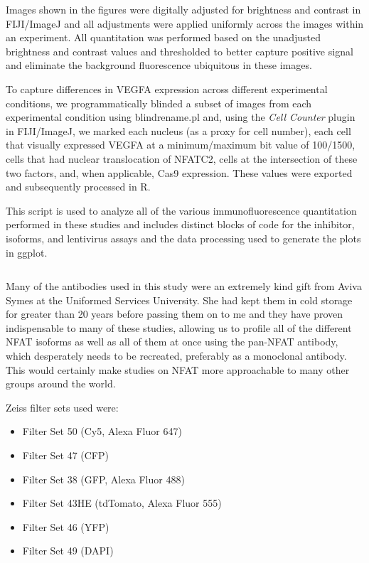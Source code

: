 Images shown in the figures were digitally adjusted for brightness and contrast in FIJI/ImageJ \citep{Schindelin2012} and all adjustments were applied uniformly across the images within an experiment. All quantitation was performed based on the unadjusted brightness and contrast values and thresholded to better capture positive signal and eliminate the background fluorescence ubiquitous in these images.

To capture differences in VEGFA expression across different experimental conditions, we programmatically blinded a subset of images from each experimental condition using blindrename.pl \citep{Salter2016} and, using the \textit{Cell Counter} plugin in FIJI/ImageJ, we marked each nucleus (as a proxy for cell number), each cell that visually expressed VEGFA at a minimum/maximum bit value of 100/1500, cells that had nuclear translocation of NFATC2, cells at the intersection of these two factors, and, when applicable, Cas9 expression. These values were exported and subsequently processed in R.

\begin{code}
\caption{This script is used to analyze all of the various immunofluorescence quantitation performed in these studies and includes distinct blocks of code for the inhibitor, isoforms, and lentivirus assays and the data processing used to generate the plots in ggplot.}
\label{thp1analysis}

\inputminted[breaklines,frame=single,fontsize=\small]{r}{source/THP-1_Processing.R}

\end{code}

Many of the antibodies used in this study were an extremely kind gift from Aviva Symes at the Uniformed Services University. She had kept them in cold storage for greater than 20 years before passing them on to me and they have proven indispensable to many of these studies, allowing us to profile all of the different NFAT isoforms as well as all of them at once using the pan\hyp{}NFAT antibody, which desperately needs to be recreated, preferably as a monoclonal antibody. This would certainly make studies on NFAT more approachable to many other groups around the world.

Zeiss filter sets used were:
\singlespacing 
\begin{itemize}
\item Filter Set 50 (Cy5, Alexa Fluor 647)
\item Filter Set 47 (CFP)
\item Filter Set 38 (GFP, Alexa Fluor 488)
\item Filter Set 43HE (tdTomato, Alexa Fluor 555)
\item Filter Set 46 (YFP)
\item Filter Set 49 (DAPI)
\end{itemize}
\doublespacing

